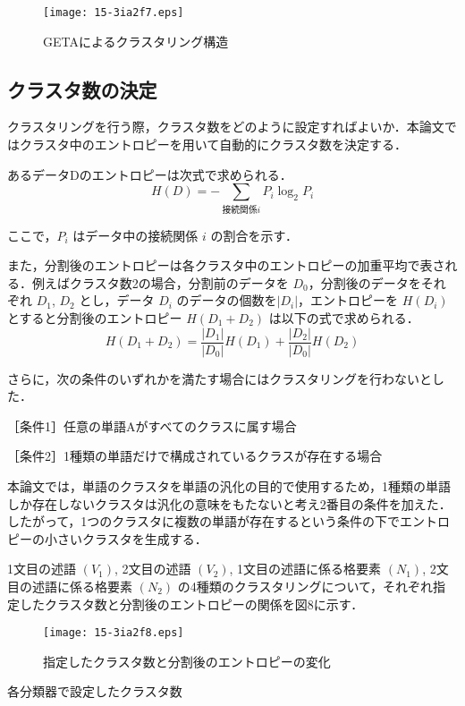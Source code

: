 \documentclass[japanese]{jnlp_1.4}
\begin{document}
\begin{figure}[t]
\centerline{\texttt{[image: 15-3ia2f7.eps]}}
\caption{GETAによるクラスタリング構造}
\end{figure}

\subsection{クラスタ数の決定}

クラスタリングを行う際，クラスタ数をどのように設定すればよいか．本論文ではクラスタ中のエントロピーを用いて自動的にクラスタ数を決定する．

あるデータDのエントロピーは次式で求められる．
\begin{equation}
H(D) = -\sum_{接続関係 i} P_{i} \log_{2} P_{i}
\end{equation}

ここで，$P_{i}$ はデータ中の接続関係 $i$ の割合を示す．

また，分割後のエントロピーは各クラスタ中のエントロピーの加重平均で表される．例えばクラスタ数2の場合，分割前のデータを $D_{0}$，分割後のデータをそれぞれ $D_{1}$, $D_{2}$ とし，データ $D_{i}$ のデータの個数を$|D_{i}|$，エントロピーを $H(D_{i})$ とすると分割後のエントロピー $H (D_{1}+D_{2})$ は以下の式で求められる．
\begin{equation}
 H(D_{1} + D_{2}) = \frac{|D_{1}|}{|D_{0}|} H(D_{1}) + \frac{|D_{2}|}{|D_{0}|} H(D_{2})
\end{equation}


さらに，次の条件のいずれかを満たす場合にはクラスタリングを行わないとした．

［条件1］任意の単語Aがすべてのクラスに属す場合

［条件2］1種類の単語だけで構成されているクラスが存在する場合

本論文では，単語のクラスタを単語の汎化の目的で使用するため，1種類の単語しか存在しないクラスタは汎化の意味をもたないと考え2番目の条件を加えた．したがって，1つのクラスタに複数の単語が存在するという条件の下でエントロピーの小さいクラスタを生成する．

1文目の述語 $(V_{1})$, 2文目の述語 $(V_{2})$, 1文目の述語に係る格要素 $(N_{1})$, 2文目の述語に係る格要素 $(N_{2})$ の4種類のクラスタリングについて，それぞれ指定したクラスタ数と分割後のエントロピーの関係を図8に示す．

\begin{figure}[t]
\centerline{\texttt{[image: 15-3ia2f8.eps]}}
\caption{指定したクラスタ数と分割後のエントロピーの変化}
\end{figure}
\begin{table}[t]
\caption{各分類器で設定したクラスタ数}

\end{table}
\end{document}

